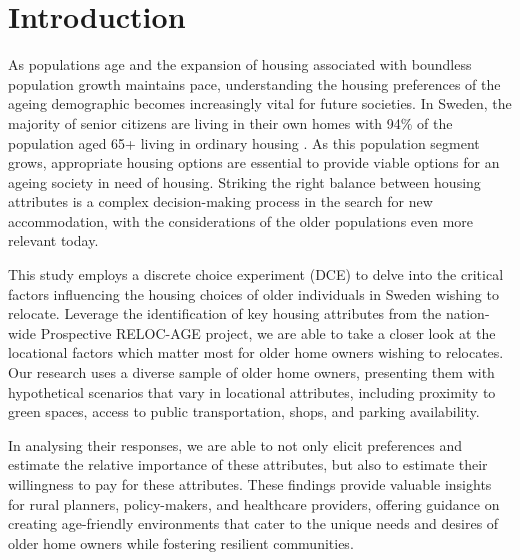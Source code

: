 \documentclass[3p,11pt ]{elsarticle}
\begin{document}
\begin{frontmatter}
\begin{abstract}
\end{abstract}
%
%
%
%
\end{frontmatter}


\newpage



\section{Introduction}

As populations age and the expansion of housing associated with boundless population growth maintains pace,
understanding the housing preferences of the ageing demographic becomes increasingly vital for future societies.
In Sweden, the majority of senior citizens are living in their own homes with 94\% of the population aged 65+ living in ordinary housing \citep{jennbertDevelopmentsElderlyPolicy2009}.
As this population segment grows,
appropriate housing options are essential to provide viable options for an ageing society in need of housing.
Striking the right balance between housing attributes is a complex decision-making process in the search for new accommodation,
with the considerations of the older populations even more relevant today.

This study employs a discrete choice experiment (DCE) to delve into the critical factors influencing the housing choices of older individuals in Sweden wishing to relocate.
Leverage the identification of key housing attributes from the nation-wide Prospective RELOC-AGE project,
we are able to take a closer look at the locational factors which matter most for older home owners wishing to relocates.
Our research uses a diverse sample of older home owners, presenting them with hypothetical scenarios that vary in locational attributes, including proximity to green spaces, access to public transportation, shops, and parking availability.

In analysing their responses, we are able to not only elicit preferences and estimate the relative importance of these attributes,
but also to estimate their willingness to pay for these attributes.
These findings provide valuable insights for rural planners, policy-makers, and healthcare providers, offering guidance on creating age-friendly environments that cater to the unique needs and desires of older home owners while fostering resilient communities.
\end{document}
